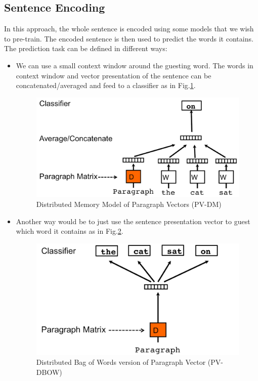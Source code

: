 \subsection{Sentence Encoding}
In this approach, the whole sentence is encoded using some models that we wish to pre-train. 
The encoded sentence is then used to predict the words it contains.  
The prediction task can be defined in different ways:
\begin{itemize}
\item We can use a small context window around the guesting word.
The words in context window and vector presentation of the sentence can be concatenated/averaged and feed to a classifier as in Fig.\ref{fig:para-vec-1}.

\begin{figure}[H]
    \centering    \includegraphics[scale=0.3]{figure/para-vec-1}
    \caption[Distributed Memory Model of Paragraph Vectors (PV-DM)]{Distributed Memory Model of Paragraph Vectors (PV-DM)~\cite{ParagraphVec}}
    \label{fig:para-vec-1}
\end{figure}

\item Another way would be to just use the sentence presentation vector to guest which word it contains as in Fig.\ref{fig:para-vec-2}.

\begin{figure}[H]
    \centering    \includegraphics[scale=0.3]{figure/para-vec-2}
    \caption[Distributed Bag of Words version of Paragraph Vector (PV-DBOW)]{Distributed Bag of Words version of Paragraph Vector (PV-DBOW)~\cite{ParagraphVec}}
    \label{fig:para-vec-2}
\end{figure}


\end{itemize}
